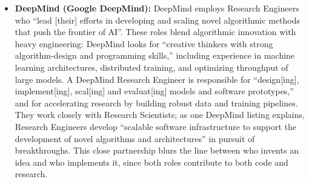 \documentclass[pdflatex,sn-mathphys-num]{sn-jnl}%
\theoremstyle{thmstyleone}%
\theoremstyle{thmstyletwo}%
\theoremstyle{thmstylethree}%
\begin{document}
\begin{itemize}
\begin{figure}[t]
\begin{minipage}{1.0\linewidth}
\begin{tikzpicture}[font=\small]
\end{tikzpicture}
    \caption{Roles Continuum. The Research Scientist (RS), Research Engineer (RE), Applied Scientist (AS), and ML Engineer (MLE) exist on a spectrum—from novel method creation to production integration, rather than as disjoint boxes. The gradient and soft overlaps highlight that teams often span multiple mandates simultaneously, depending on product maturity and organizational needs.}
    \label{fig:my-tikz}
  \end{minipage}
\end{figure}

\item \textbf{DeepMind (Google DeepMind):} DeepMind employs Research Engineers who “lead [their] efforts in developing and scaling novel algorithmic methods that push the frontier of AI”\cite{DeepMind-RE-2025}. These roles blend algorithmic innovation with heavy engineering: DeepMind looks for “creative thinkers with strong algorithm-design and programming skills,” including experience in machine learning architectures, distributed training, and optimizing throughput of large models\cite{DeepMind-RE-2025}. A DeepMind Research Engineer is responsible for “design[ing], implement[ing], scal[ing] and evaluat[ing] models and software prototypes,” and for accelerating research by building robust data and training pipelines\cite{DeepMind-RE-2025}. They work closely with Research Scientists; as one DeepMind listing explains, Research Engineers develop “scalable software infrastructure to support the development of novel algorithms and architectures” in pursuit of breakthroughs\cite{DeepMind-RE-2025}. This close partnership blurs the line between who invents an idea and who implements it, since both roles contribute to both code and research. 


\end{itemize}
\end{document}
